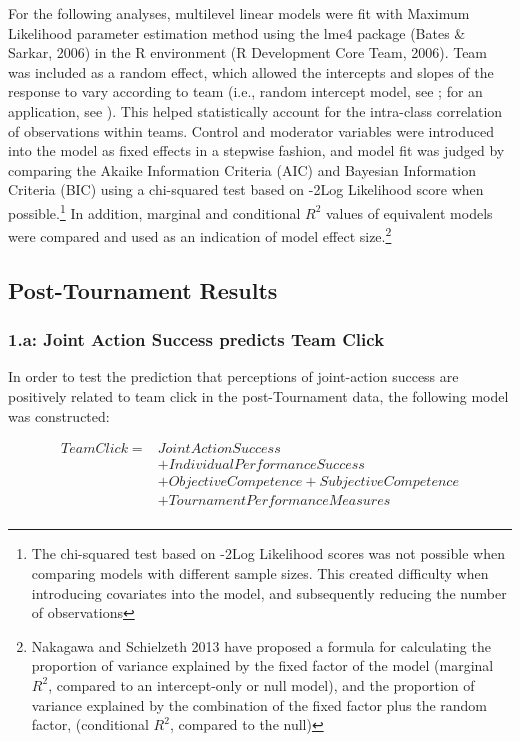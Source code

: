 \documentclass[12pt]{report}
\begin{document}
{For the following analyses, multilevel linear models were fit with Maximum Likelihood parameter estimation method using the lme4 package (Bates & Sarkar, 2006) in the R environment (R Development Core Team, 2006).  Team was included as a random effect, which allowed the intercepts and slopes of the response to vary according to team (i.e., random intercept model, see \citep{Pinheiro2000}; for an application, see \citep{Oberauer2006}). This helped statistically account for the intra-class correlation of observations within teams. Control and moderator variables were introduced into the model as fixed effects in a stepwise fashion, and model fit was judged by comparing the Akaike Information Criteria (AIC) and Bayesian Information Criteria (BIC) using a chi-squared test based on -2Log Likelihood score when possible.\footnote{The chi-squared test based on -2Log Likelihood scores was not possible when comparing models with different sample sizes.  This created difficulty when introducing covariates into the model, and subsequently reducing the number of observations} In addition, marginal and conditional $R^2$ values of equivalent models were compared and used as an indication of model effect size.\footnote{Nakagawa and Schielzeth 2013 have proposed a formula for calculating the proportion of variance explained by the fixed factor of the model (marginal $R^2$, compared to an intercept-only or null model), and the proportion of variance explained by the combination of the fixed factor plus the random factor, (conditional $R^2$, compared to the null)}



\subsection{Post-Tournament Results}

\subsubsection{1.a: Joint Action Success predicts Team Click}

In order to test the prediction that perceptions of joint-action success are positively related to team click in the post-Tournament data, the following model was constructed:

\begin{equation}
  \begin{align*}
    Team Click =  & Joint Action Success\\
              & + Individual Performance Success \\
              & + Objective Competence + Subjective Competence\\
              & + TournamentPerformanceMeasures \\
  \end{align*}
\end{equation}
\bigskip

}
\end{document}
